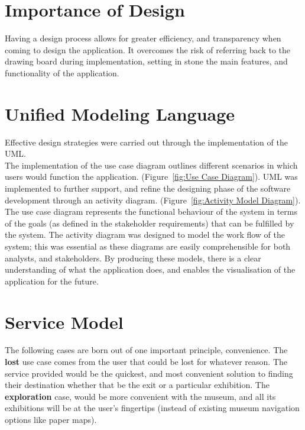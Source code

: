 
\section{Importance of Design}
Having a design process allows for greater efficiency, and transparency when coming to design the application. It overcomes the risk of referring back to the drawing board during implementation, setting in stone the main features, and functionality of the application.

\section{Unified Modeling Language}
Effective design strategies were carried out through the implementation of the UML.\\

The implementation of the use case diagram outlines different scenarios in which users would function the application. (Figure~\ref{fig:Use Case Diagram}). UML was implemented to further support, and refine the designing phase of the software development through an activity diagram. (Figure~\ref{fig:Activity Model Diagram}).\\

The use case diagram represents the functional behaviour of the system in terms of the goals (as defined in the stakeholder requirements) that can be fulfilled by the system. The activity diagram was designed to model the work flow of the system; this was essential as these diagrams are easily comprehensible for both analysts, and stakeholders. By producing these models, there is a clear understanding of what the application does, and enables the visualisation of the application for the future.

\section{Service Model}
The following cases are born out of one important principle, convenience. The \textbf{lost} use case comes from the user that could be lost for whatever reason. The service provided would be the quickest, and most convenient solution to finding their destination whether that be the exit or a particular exhibition. The \textbf{exploration} case, would be more convenient with the museum, and all its exhibitions will be at the user's fingertips (instead of existing museum navigation options like paper maps).

